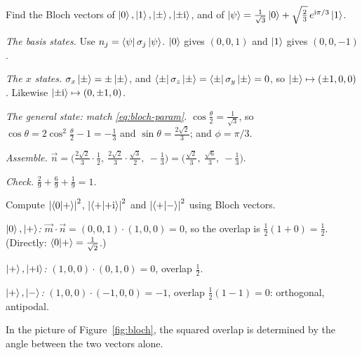 \begin{example}\label{ex:bloch-vectors}
  Find the Bloch vectors of $\left|0\right\rangle,\left|1\right\rangle,\left|\pm\right\rangle,\left|\pm\mathrm{i}\right\rangle$, and of $\left|\psi\right\rangle=\frac1{\sqrt3}\left|0\right\rangle+\sqrt{\tfrac23}\,e^{\mathrm{i}\pi/3}\left|1\right\rangle$.
\end{example}
\begin{solution}
  \begin{steps}
    \item \emph{The basis states.} Use $n_j=\left\langle\psi\right|\sigma_j\left|\psi\right\rangle$. $\left|0\right\rangle$ gives $(0,0,1)$ and $\left|1\right\rangle$ gives $(0,0,-1)$.
    \item \emph{The $x$ states.} $\sigma_x\left|\pm\right\rangle=\pm\left|\pm\right\rangle$, and $\left\langle\pm\right|\sigma_z\left|\pm\right\rangle=\left\langle\pm\right|\sigma_y\left|\pm\right\rangle=0$, so $\left|\pm\right\rangle\mapsto(\pm1,0,0)$. Likewise $\left|\pm\mathrm{i}\right\rangle\mapsto(0,\pm1,0)$.
    \item \emph{The general state: match \eqref{eq:bloch-param}.} $\cos\frac\theta2=\frac1{\sqrt3}$, so $\cos\theta=2\cos^2\frac\theta2-1=-\tfrac13$ and $\sin\theta=\tfrac{2\sqrt2}{3}$; and $\phi=\pi/3$.
    \item \emph{Assemble.} $\vec n=\bigl(\tfrac{2\sqrt2}{3}\cdot\tfrac12,\ \tfrac{2\sqrt2}{3}\cdot\tfrac{\sqrt3}{2},\ -\tfrac13\bigr)=\bigl(\tfrac{\sqrt2}{3},\ \tfrac{\sqrt6}{3},\ -\tfrac13\bigr)$.
    \item \emph{Check.} $\tfrac29+\tfrac69+\tfrac19=1$.
  \end{steps}
\end{solution}

\begin{example}\label{ex:bloch-overlap}
  Compute $\left|\left\langle0\middle|+\right\rangle\right|^2$, $\left|\left\langle+\middle|+\mathrm{i}\right\rangle\right|^2$ and $\left|\left\langle+\middle|-\right\rangle\right|^2$ using Bloch vectors.
\end{example}
\begin{solution}
  \begin{steps}
    \item \emph{$\left|0\right\rangle,\left|+\right\rangle$:} $\vec m\cdot\vec n=(0,0,1)\cdot(1,0,0)=0$, so the overlap is $\tfrac12(1+0)=\tfrac12$. (Directly: $\left\langle0\middle|+\right\rangle=\tfrac1{\sqrt2}$.)
    \item \emph{$\left|+\right\rangle,\left|+\mathrm{i}\right\rangle$:} $(1,0,0)\cdot(0,1,0)=0$, overlap $\tfrac12$.
    \item \emph{$\left|+\right\rangle,\left|-\right\rangle$:} $(1,0,0)\cdot(-1,0,0)=-1$, overlap $\tfrac12(1-1)=0$: orthogonal, antipodal.
  \end{steps}
  In the picture of Figure~\ref{fig:bloch}, the squared overlap is determined by the angle between the two vectors alone.
\end{solution}

